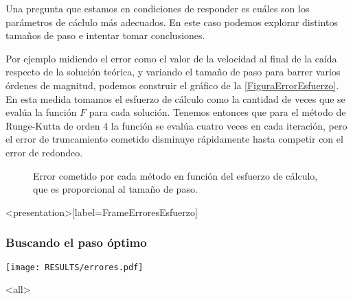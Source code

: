 
Una pregunta que estamos en condiciones de responder es cuáles son los parámetros 
de cáclulo más adecuados. En este caso podemos explorar distintos tamaños de paso
e intentar tomar conclusiones.

Por ejemplo midiendo el error como el valor de la velocidad al final de la caída 
respecto de la solución teórica, y variando el tamaño de paso para barrer varios 
órdenes de magnitud, podemos construir el gráfico de la \autoref{FiguraErrorEsfuerzo}.
En esta medida tomamos el esfuerzo de cálculo como la cantidad de veces que se evalúa la 
función $F$ para cada solución. Tenemos entonces que para el método de Runge-Kutta de orden 
4 la función se evalúa cuatro veces en cada iteración, pero el error de truncamiento 
cometido disminuye rápidamente hasta competir con el error de redondeo.

\begin{figure}[H]
  \caption{\protect\label{FiguraErrorEsfuerzo} 
  Error cometido por cada método en función del esfuerzo de cálculo, que es proporcional 
  al tamaño de paso.}
\end{figure}

\mode*

\begin{frame}<presentation>[label=FrameErroresEsfuerzo]
  \frametitle{Buscando el paso óptimo}
  \center
  \texttt{[image: RESULTS/errores.pdf]}
\end{frame}

\mode<all>

